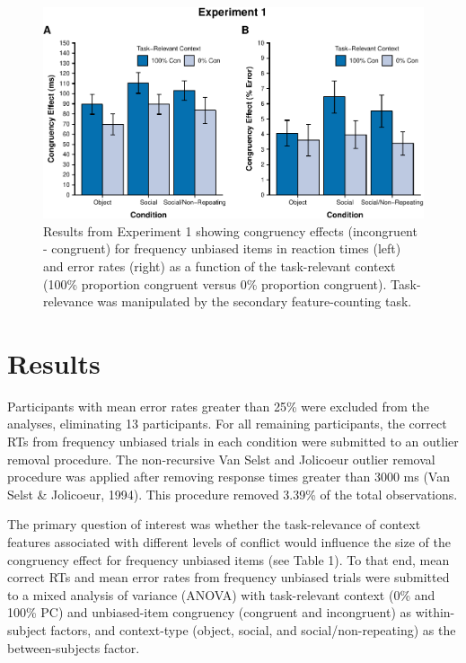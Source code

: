 \documentclass[english,,man,floatsintext]{apa6}
\begin{document}
\begin{figure}
\centering
\includegraphics{manuscript_pretty_files/figure-latex/figure2-1.pdf}
\caption{\label{fig:figure2}Results from Experiment 1 showing congruency effects (incongruent - congruent) for frequency unbiased items in reaction times (left) and error rates (right) as a function of the task-relevant context (100\% proportion congruent versus 0\% proportion congruent). Task-relevance was manipulated by the secondary feature-counting task.}
\end{figure}



\hypertarget{results}{%
\section{Results}\label{results}}

Participants with mean error rates greater than 25\% were excluded from the analyses, eliminating 13 participants. For all remaining participants, the correct RTs from frequency unbiased trials in each condition were submitted to an outlier removal procedure. The non-recursive Van Selst and Jolicoeur outlier removal procedure was applied after removing response times greater than 3000 ms (Van Selst \& Jolicoeur, 1994). This procedure removed 3.39\% of the total observations.

The primary question of interest was whether the task-relevance of context features associated with different levels of conflict would influence the size of the congruency effect for frequency unbiased items (see Table 1). To that end, mean correct RTs and mean error rates from frequency unbiased trials were submitted to a mixed analysis of variance (ANOVA) with task-relevant context (0\% and 100\% PC) and unbiased-item congruency (congruent and incongruent) as within-subject factors, and context-type (object, social, and social/non-repeating) as the between-subjects factor.
\end{document}

